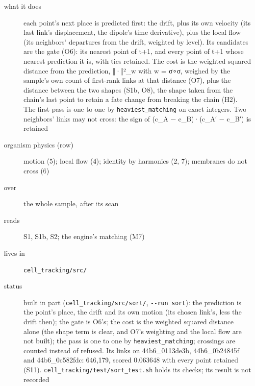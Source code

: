 \begin{description}
\item[{what it does}] each point's next place is predicted first: the drift, plus its own velocity (its last link's displacement, the dipole's time derivative), plus the local flow (its neighbors' departures from the drift, weighted by level). Its candidates are the gate (O6): its nearest point of t+1, and every point of t+1 whose nearest prediction it is, with ties retained. The cost is the weighted squared distance from the prediction, ‖·‖²\_\allowbreak{}w with w = σ∘σ, weighed by the sample's own count of first-rank links at that distance (O7), plus the distance between the two shapes (S1b, O8), the shape taken from the chain's last point to retain a fate change from breaking the chain (H2). The first pass is one to one by \texttt{heaviest\_\allowbreak{}matching} on exact integers. Two neighbors' links may not cross: the sign of (c\_\allowbreak{}A − c\_\allowbreak{}B)·(c\_\allowbreak{}A′ − c\_\allowbreak{}B′) is retained
\item[{organism physics (row)}] motion (5); local flow (4); identity by harmonics (2, 7); membranes do not cross (6)
\item[{over}] the whole sample, after its scan
\item[{reads}] S1, S1b, S2; the engine's matching (M7)
\item[{lives in}] \texttt{cell\_\allowbreak{}tracking/\allowbreak{}src/\allowbreak{}}
\item[{status}] built in part (\texttt{cell\_\allowbreak{}tracking/\allowbreak{}src/\allowbreak{}sort/\allowbreak{}}, \texttt{-\allowbreak{}-\allowbreak{}run sort}): the prediction is the point's place, the drift and its own motion (its chosen link's, less the drift then); the gate is O6's; the cost is the weighted squared distance alone (the shape term is clear, and O7's weighting and the local flow are not built); the pass is one to one by \texttt{heaviest\_\allowbreak{}matching}; crossings are counted instead of refused. Its links on 44b6\_\allowbreak{}0113de3b, 44b6\_\allowbreak{}0b24845f and 44b6\_\allowbreak{}0c582fdc: 646,179, scored 0.063648 with every point retained (S11). \texttt{cell\_\allowbreak{}tracking/\allowbreak{}test/\allowbreak{}sort\_\allowbreak{}test.\allowbreak{}sh} holds its checks; its result is not recorded
\end{description}

